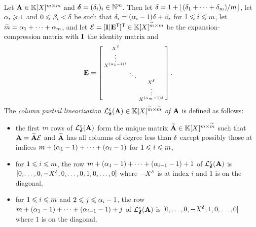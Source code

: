 \documentclass[preprint]{sig-alternate-05-2015}
\begin{document}
\vspace{-0.15cm}
\begin{dfn}
  \label{dfn:parlin}
  ~\\ Let $\mat{A} \in \polMatSpace[\rdim]$ and $\boldsymbol{\delta} = (\delta_i)_i \in
  \mathbb{N}^m$. Then let $\delta = 1 + \lfloor (\delta_1 + \cdots +
  \delta_m) / m \rfloor$, let $\alpha_i \geqslant 1$ and $0 \leqslant \beta_i <
  \delta$ be such that $\delta_i = (\alpha_i -1) \delta + \beta_i$ for $1
  \leqslant i \leqslant m$, let $\widetilde{m} = \alpha_1 + \cdots + \alpha_m$,
  and let $\expandMat = \trsp{[\idMat[] | \trsp{\mat{E}}]} \in
  \polMatSpace[\expand{\rdim}][\rdim]$ be the expansion-compression matrix with
  $\idMat[]$ the identity matrix and
  \begin{equation}
    \label{eqn:expandMatbis}
    \mat{E} = 
    \left[\begin{smallmatrix}
      X^\degExp \\
      \vdots \\
      X^{(\quoExp_1-1)\degExp} \\
      & \ddots \\
      & & X^\degExp \\
      & & \vdots \\
      & & X^{(\quoExp_\nbun-1)\degExp}
    \end{smallmatrix}\right].
  \end{equation}
  The \emph{column partial linearization
    $\colParLin{\minDegs}{\mat{A}} \in \polMatSpace[\expand{\rdim}]$ of
    $\mat{A}$} is defined as follows:
    \vspace{-0.2cm}
  \begin{itemize}
  \setlength\itemsep{0cm}
    \item the first $m$ rows of $\colParLin{\minDegs}{\mat{A}}$ form
      the unique matrix $\expand{\mat{A}} \in
      \polMatSpace[\rdim][\expand{\rdim}]$ such that $\mat{A} =
      \expand{\mat{A}} \expandMat$ and $\expand{\mat{A}}$ has all columns of
      degree less than $\delta$ except possibly those at indices $m +
      (\alpha_1-1) + \cdots + (\alpha_i-1)$ for $1\leqslant i \leqslant m$,
    \item for $1\leqslant i \leqslant m$, the row $m + (\alpha_1-1) + \cdots +
      (\alpha_{i-1}-1) +1$ of $\colParLin{\minDegs}{\mat{A}}$ is $[ 0, \ldots,
      0, -X^\delta, 0, \ldots, 0, 1, 0, \ldots, 0]$ where
      $-X^\delta$ is at index $i$ and $1$ is on the diagonal,
    \item for $1\leqslant i \leqslant m$ and $2 \leqslant j \leqslant \alpha_i-1$, the row
      $m + (\alpha_1-1) + \cdots + (\alpha_{i-1}-1) + j$ of
      $\colParLin{\minDegs}{\mat{A}}$ is $[ 0, \ldots, 0, -X^\delta, 1, 0,
      \ldots, 0]$ where $1$ is on the diagonal.
  \end{itemize}
\end{dfn}
\end{document}
